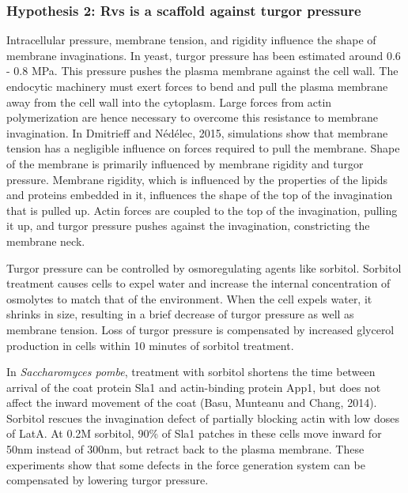 \subsubsection{Hypothesis 2: Rvs is a scaffold against turgor pressure} 
	
Intracellular pressure, membrane tension, and rigidity influence the shape of membrane invaginations. In yeast, turgor pressure has been estimated around 0.6 - 0.8 MPa. This pressure pushes the plasma membrane against the cell wall. The endocytic machinery must exert forces to bend and pull the plasma membrane away from the cell wall into the cytoplasm. Large forces from actin polymerization are hence necessary to overcome this resistance to membrane invagination. In Dmitrieff and Nédélec, 2015, simulations show that membrane tension has a negligible influence on forces required to pull the membrane. Shape of the membrane is primarily influenced by membrane rigidity and turgor pressure. Membrane rigidity, which is influenced by the properties of the lipids and proteins embedded in it, influences the shape of the top of the invagination that is pulled up. Actin forces are coupled to the top of the invagination, pulling it up, and turgor pressure pushes against the invagination, constricting the membrane neck.  
\vspace{5mm}

Turgor pressure can be controlled by osmoregulating agents like sorbitol. Sorbitol treatment causes cells to expel water and increase the internal concentration of osmolytes to match that of the environment. When the cell expels water, it shrinks in size, resulting in a brief decrease of turgor pressure as well as membrane tension. Loss of turgor pressure is compensated by increased glycerol production in cells within 10 minutes of sorbitol treatment.
\vspace{5mm}

In \textit{Saccharomyces pombe}, treatment with sorbitol shortens the time between arrival of the coat protein Sla1 and actin-binding protein App1, but does not affect the inward movement of the coat (Basu, Munteanu and Chang, 2014). Sorbitol rescues the invagination defect of partially blocking actin with low doses of LatA. At 0.2M sorbitol, 90\% of Sla1 patches in these cells move inward for 50nm instead of 300nm, but retract back to the plasma membrane. These experiments show that some defects in the force generation system can be compensated by lowering turgor pressure.  
\vspace{5mm}

